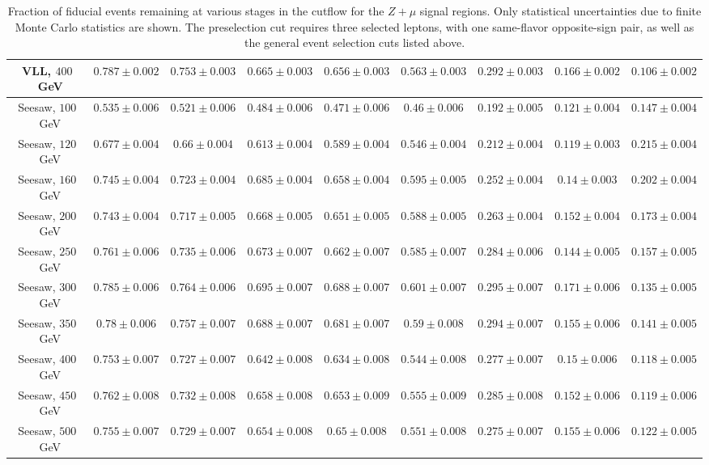 \begin{table}[ht]
{\begin{tabular}{|c|c|c|c|c|c||c|c|c|}
		\hline
		VLL, $400$~GeV	&	$0.787 \pm 0.002$	&	$0.753 \pm 0.003$	&	$0.665 \pm 0.003$	&	$0.656 \pm 0.003$	&	$0.563 \pm 0.003$	&	$0.292 \pm 0.003$ &	$0.166 \pm 0.002$	&	$0.106 \pm 0.002$\\
		\hline
		Seesaw, $100$~GeV	&	$0.535 \pm 0.006$	&	$0.521 \pm 0.006$	&	$0.484 \pm 0.006$	&	$0.471 \pm 0.006$	&	$0.46 \pm 0.006$	&	$0.192 \pm 0.005$ &	$0.121 \pm 0.004$	&	$0.147 \pm 0.004$\\
		\hline
		Seesaw, $120$~GeV	&	$0.677 \pm 0.004$	&	$0.66 \pm 0.004$	&	$0.613 \pm 0.004$	&	$0.589 \pm 0.004$	&	$0.546 \pm 0.004$	&	$0.212 \pm 0.004$ &	$0.119 \pm 0.003$	&	$0.215 \pm 0.004$\\
		\hline
		Seesaw, $160$~GeV	&	$0.745 \pm 0.004$	&	$0.723 \pm 0.004$	&	$0.685 \pm 0.004$	&	$0.658 \pm 0.004$	&	$0.595 \pm 0.005$	&	$0.252 \pm 0.004$ &	$0.14 \pm 0.003$	&	$0.202 \pm 0.004$\\
		\hline
		Seesaw, $200$~GeV	&	$0.743 \pm 0.004$	&	$0.717 \pm 0.005$	&	$0.668 \pm 0.005$	&	$0.651 \pm 0.005$	&	$0.588 \pm 0.005$	&	$0.263 \pm 0.004$ &	$0.152 \pm 0.004$	&	$0.173 \pm 0.004$\\
		\hline
		Seesaw, $250$~GeV	&	$0.761 \pm 0.006$	&	$0.735 \pm 0.006$	&	$0.673 \pm 0.007$	&	$0.662 \pm 0.007$	&	$0.585 \pm 0.007$	&	$0.284 \pm 0.006$ &	$0.144 \pm 0.005$	&	$0.157 \pm 0.005$\\
		\hline
		Seesaw, $300$~GeV	&	$0.785 \pm 0.006$	&	$0.764 \pm 0.006$	&	$0.695 \pm 0.007$	&	$0.688 \pm 0.007$	&	$0.601 \pm 0.007$	&	$0.295 \pm 0.007$ &	$0.171 \pm 0.006$	&	$0.135 \pm 0.005$\\
		\hline
		Seesaw, $350$~GeV	&	$0.78 \pm 0.006$	&	$0.757 \pm 0.007$	&	$0.688 \pm 0.007$	&	$0.681 \pm 0.007$	&	$0.59 \pm 0.008$	&	$0.294 \pm 0.007$ &	$0.155 \pm 0.006$	&	$0.141 \pm 0.005$\\
		\hline
		Seesaw, $400$~GeV	&	$0.753 \pm 0.007$	&	$0.727 \pm 0.007$	&	$0.642 \pm 0.008$	&	$0.634 \pm 0.008$	&	$0.544 \pm 0.008$	&	$0.277 \pm 0.007$ &	$0.15 \pm 0.006$	&	$0.118 \pm 0.005$\\
		\hline
		Seesaw, $450$~GeV	&	$0.762 \pm 0.008$	&	$0.732 \pm 0.008$	&	$0.658 \pm 0.008$	&	$0.653 \pm 0.009$	&	$0.555 \pm 0.009$	&	$0.285 \pm 0.008$ &	$0.152 \pm 0.006$	&	$0.119 \pm 0.006$\\
		\hline
		Seesaw, $500$~GeV	&	$0.755 \pm 0.007$	&	$0.729 \pm 0.007$	&	$0.654 \pm 0.008$	&	$0.65 \pm 0.008$	&	$0.551 \pm 0.008$	&	$0.275 \pm 0.007$ &	$0.155 \pm 0.006$	&	$0.122 \pm 0.005$\\
		\hline
	\end{tabular}
	}
	\caption{Fraction of fiducial events remaining at various stages in the cutflow for the $Z+\mu$ signal regions. Only statistical uncertainties due to finite Monte Carlo statistics are shown. The preselection cut requires three selected leptons, with one same-flavor opposite-sign pair, as well as the general event selection cuts listed above.}
	\label{table:fiducial-efficiencies-Zmu}
\end{table}

